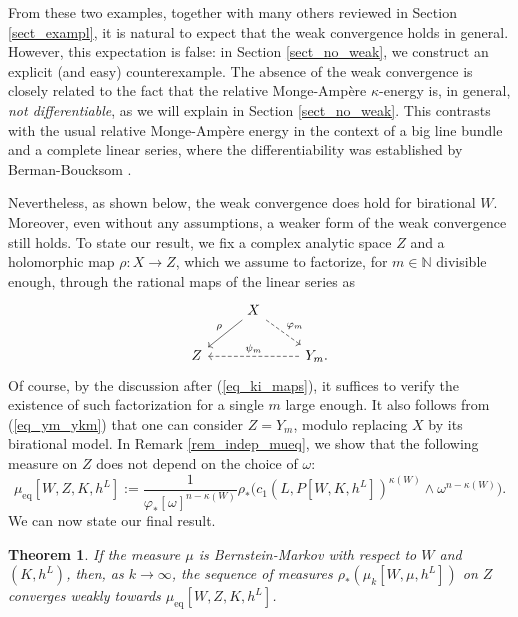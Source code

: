 \documentclass[12pt]{article}
\numberwithin{equation}{section}
\theoremstyle{theorem}
\newtheorem{thm}{Theorem}[section]
\theoremstyle{definition}
\theoremstyle{remark}
\newcommand{\nat}{\mathbb{N}}
\begin{document}
	\par 
	From these two examples, together with many others reviewed in Section \ref{sect_exampl}, it is natural to expect that the weak convergence holds in general.
	However, this expectation is false: in Section \ref{sect_no_weak}, we construct an explicit (and easy) counterexample.
	The absence of the weak convergence is closely related to the fact that the relative Monge-Ampère $\kappa$-energy is, in general, \textit{not differentiable}, as we will explain in Section \ref{sect_no_weak}. 
	This contrasts with the usual relative Monge-Ampère energy in the context of a big line bundle and a complete linear series, where the differentiability was established by Berman-Boucksom \cite{BermanBouckBalls}.
	\par 
	Nevertheless, as shown below, the weak convergence does hold for birational $W$.
	Moreover, even without any assumptions, a weaker form of the weak convergence still holds.
	To state our result, we fix a complex analytic space $Z$ and a holomorphic map $\rho : X \to Z$, which we assume to factorize, for $m \in \nat$ divisible enough, through the rational maps of the linear series as
	\begin{equation}\label{eq_rat_maps_z}
		\begin{tikzcd}
		& X \arrow[dl, "\rho"'] \arrow[dr, dashed, "\varphi_m"] & \\
Z & & \arrow[ll, dashed, "\psi_m"'] Y_m.
		\end{tikzcd}
	\end{equation}
	Of course, by the discussion after (\ref{eq_ki_maps}), it suffices to verify the existence of such factorization for a single $m$ large enough.
	It also follows from (\ref{eq_ym_ykm}) that one can consider $Z = Y_m$, modulo replacing $X$ by its birational model.
	In Remark \ref{rem_indep_mueq}, we show that the following measure on $Z$ does not depend on the choice of $\omega$:
	\begin{equation}\label{eq_quil_pushed_y}
		\mu_{\mathrm{eq}}[W, Z, K, h^L] :=
		\frac{1}{\varphi_{*} [\omega]^{n - \kappa(W)}} \rho_{*}  
		\Big(
		c_1(L, P[W, K, h^L])^{\kappa(W)} \wedge \omega^{n - \kappa(W)}
		\Big).
	\end{equation}
	We can now state our final result.
	\begin{thm}\label{thm_part_bk_get}
		If the measure $\mu$ is Bernstein-Markov with respect to $W$ and $(K, h^L)$, then, as $k \to \infty$, the sequence of measures $\rho_{*}( \mu_k[W, \mu, h^L])$ on $Z$ converges weakly towards $\mu_{\mathrm{eq}}[W, Z, K, h^L]$.
	\end{thm}
\end{document}
